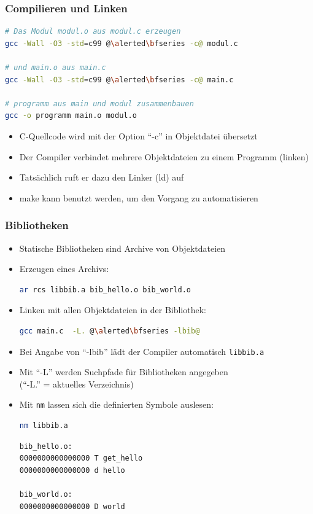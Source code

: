\documentclass{slides}
\begin{document}
\begin{frame}[fragile]
  \frametitle{Compilieren und Linken}

\begin{lstlisting}[language=bash,emph={c,o}]
# Das Modul modul.o aus modul.c erzeugen
gcc -Wall -O3 -std=c99 @\alerted\bfseries -c@ modul.c

# und main.o aus main.c
gcc -Wall -O3 -std=c99 @\alerted\bfseries -c@ main.c

# programm aus main und modul zusammenbauen
gcc -o programm main.o modul.o
\end{lstlisting}

  \begin{itemize}
  \item C-Quellcode wird mit der Option "`-c"' in Objektdatei übersetzt
  \item Der Compiler verbindet mehrere Objektdateien zu einem Programm
    (\alert{linken})
  \item Tatsächlich ruft er dazu den Linker (ld) auf
  \item make kann benutzt werden, um den Vorgang zu automatisieren
  \end{itemize}
\end{frame}

\begin{frame}[fragile]
  \frametitle{Bibliotheken}

  \begin{itemize}
  \item Statische Bibliotheken sind Archive von Objektdateien
  \item Erzeugen eines Archivs:\\
\begin{lstlisting}[language=bash,emph={ar},style=unframed]
ar rcs libbib.a bib_hello.o bib_world.o
\end{lstlisting}
  \item Linken mit allen Objektdateien in der Bibliothek:
\begin{lstlisting}[language=bash,style=unframed]
gcc main.c  -L. @\alerted\bfseries -lbib@
\end{lstlisting}
  \item Bei Angabe von "`-lbib"' lädt der Compiler automatisch \lstinline[language=bash]!libbib.a!
  \item Mit "`-L"' werden Suchpfade für Bibliotheken angegeben\\
    ("`-L."' = aktuelles Verzeichnis)
  \item Mit \lstinline!nm! lassen sich die definierten Symbole auslesen:
\begin{lstlisting}[language=bash,emph={nm},style=unframed]
nm libbib.a
\end{lstlisting}
\begin{lstlisting}[basicstyle={\fontfamily{fvm}\tiny},language=bash]
bib_hello.o:
0000000000000000 T get_hello
0000000000000000 d hello
      
bib_world.o:
0000000000000000 D world
\end{lstlisting}
\end{itemize}
\end{frame}
\end{document}
